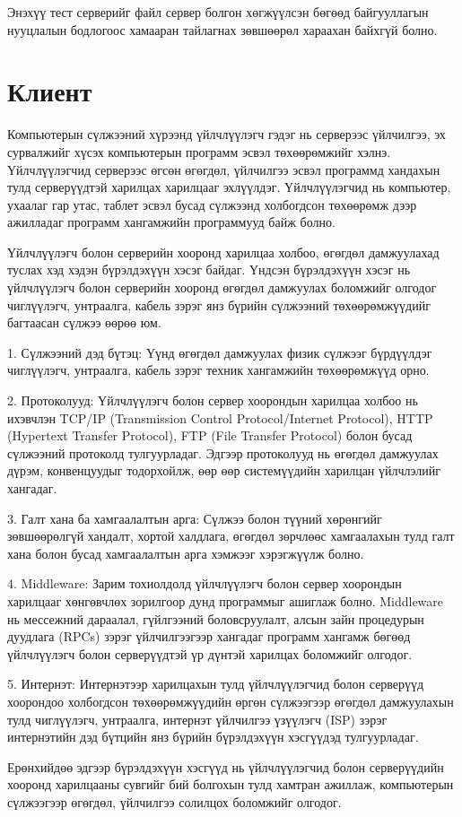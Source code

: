Энэхүү тест серверийг файл сервер болгон хөгжүүлсэн бөгөөд байгууллагын нууцлалын бодлогоос хамааран тайлагнах зөвшөөрөл хараахан байхгүй болно.
\pagebreak
\section{Клиент}
Компьютерын сүлжээний хүрээнд үйлчлүүлэгч гэдэг нь серверээс үйлчилгээ, эх сурвалжийг хүсэх компьютерын программ эсвэл төхөөрөмжийг хэлнэ. Үйлчлүүлэгчид серверээс өгсөн өгөгдөл, үйлчилгээ эсвэл программд хандахын тулд серверүүдтэй харилцах харилцааг эхлүүлдэг. Үйлчлүүлэгчид нь компьютер, ухаалаг гар утас, таблет эсвэл бусад сүлжээнд холбогдсон төхөөрөмж дээр ажилладаг программ хангамжийн программууд байж болно.

Үйлчлүүлэгч болон серверийн хооронд харилцаа холбоо, өгөгдөл дамжуулахад туслах хэд хэдэн бүрэлдэхүүн хэсэг байдаг. Үндсэн бүрэлдэхүүн хэсэг нь үйлчлүүлэгч болон серверийн хооронд өгөгдөл дамжуулах боломжийг олгодог чиглүүлэгч, унтраалга, кабель зэрэг янз бүрийн сүлжээний төхөөрөмжүүдийг багтаасан сүлжээ өөрөө юм.

1. Сүлжээний дэд бүтэц: Үүнд өгөгдөл дамжуулах физик сүлжээг бүрдүүлдэг чиглүүлэгч, унтраалга, кабель зэрэг техник хангамжийн төхөөрөмжүүд орно.

2. Протоколууд: Үйлчлүүлэгч болон сервер хоорондын харилцаа холбоо нь ихэвчлэн TCP/IP (Transmission Control Protocol/Internet Protocol), HTTP (Hypertext Transfer Protocol), FTP (File Transfer Protocol) болон бусад сүлжээний протоколд тулгуурладаг. Эдгээр протоколууд нь өгөгдөл дамжуулах дүрэм, конвенцуудыг тодорхойлж, өөр өөр системүүдийн харилцан үйлчлэлийг хангадаг.

3. Галт хана ба хамгаалалтын арга: Сүлжээ болон түүний хөрөнгийг зөвшөөрөлгүй хандалт, хортой халдлага, өгөгдөл зөрчлөөс хамгаалахын тулд галт хана болон бусад хамгаалалтын арга хэмжээг хэрэгжүүлж болно.

4. Middleware: Зарим тохиолдолд үйлчлүүлэгч болон сервер хоорондын харилцааг хөнгөвчлөх зорилгоор дунд программыг ашиглаж болно. Middleware нь мессежний дараалал, гүйлгээний боловсруулалт, алсын зайн процедурын дуудлага (RPCs) зэрэг үйлчилгээгээр хангадаг программ хангамж бөгөөд үйлчлүүлэгч болон серверүүдтэй үр дүнтэй харилцах боломжийг олгодог.

5. Интернэт: Интернэтээр харилцахын тулд үйлчлүүлэгчид болон серверүүд хоорондоо холбогдсон төхөөрөмжүүдийн өргөн сүлжээгээр өгөгдөл дамжуулахын тулд чиглүүлэгч, унтраалга, интернэт үйлчилгээ үзүүлэгч (ISP) зэрэг интернэтийн дэд бүтцийн янз бүрийн бүрэлдэхүүн хэсгүүдэд тулгуурладаг.

Ерөнхийдөө эдгээр бүрэлдэхүүн хэсгүүд нь үйлчлүүлэгчид болон серверүүдийн хооронд харилцааны сувгийг бий болгохын тулд хамтран ажиллаж, компьютерын сүлжээгээр өгөгдөл, үйлчилгээ солилцох боломжийг олгодог.
\pagebreak